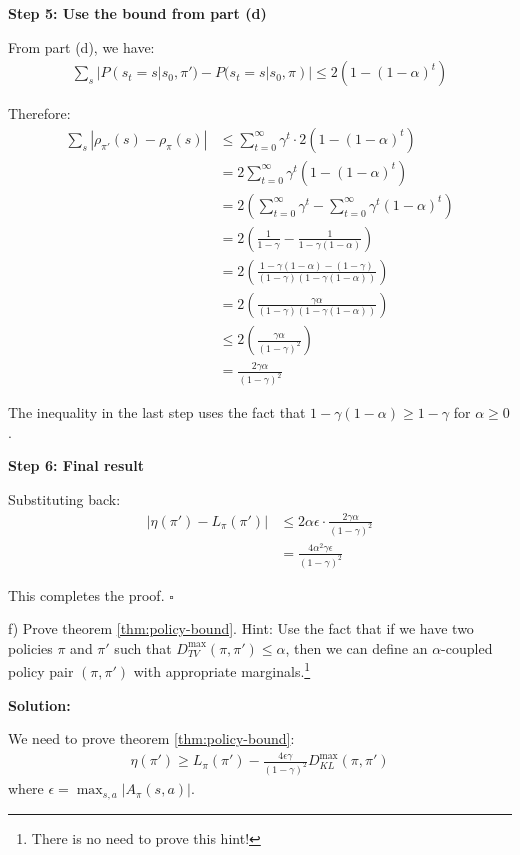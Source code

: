 \textbf{Step 5: Use the bound from part (d)}

From part (d), we have:
\begin{align}
\sum_{s} |P(s_t = s | s_0, \pi') - P(s_t = s | s_0, \pi)| \le 2(1-(1-\alpha)^t)
\end{align}

Therefore:
\begin{align}
\sum_{s} |\rho_{\pi'}(s) - \rho_{\pi}(s)| &\le \sum_{t=0}^{\infty} \gamma^t \cdot 2(1-(1-\alpha)^t) \\
&= 2 \sum_{t=0}^{\infty} \gamma^t (1-(1-\alpha)^t) \\
&= 2 \left( \sum_{t=0}^{\infty} \gamma^t - \sum_{t=0}^{\infty} \gamma^t (1-\alpha)^t \right) \\
&= 2 \left( \frac{1}{1-\gamma} - \frac{1}{1-\gamma(1-\alpha)} \right) \\
&= 2 \left( \frac{1-\gamma(1-\alpha) - (1-\gamma)}{(1-\gamma)(1-\gamma(1-\alpha))} \right) \\
&= 2 \left( \frac{\gamma\alpha}{(1-\gamma)(1-\gamma(1-\alpha))} \right) \\
&\le 2 \left( \frac{\gamma\alpha}{(1-\gamma)^2} \right) \\
&= \frac{2\gamma\alpha}{(1-\gamma)^2}
\end{align}

The inequality in the last step uses the fact that $1-\gamma(1-\alpha) \ge 1-\gamma$ for $\alpha \ge 0$.

\textbf{Step 6: Final result}

Substituting back:
\begin{align}
|\eta(\pi') - L_{\pi}(\pi')| &\le 2\alpha\epsilon \cdot \frac{2\gamma\alpha}{(1-\gamma)^2} \\
&= \frac{4\alpha^2\gamma\epsilon}{(1-\gamma)^2}
\end{align}

This completes the proof. $\square$

f) Prove theorem \ref{thm:policy-bound}. Hint: Use the fact that if we have two policies $\pi$ and $\pi'$ such that $D_{TV}^{\max} (\pi, \pi') \le \alpha$, then we can define an $\alpha$-coupled policy pair $(\pi, \pi')$ with appropriate marginals.\footnote{There is no need to prove this hint!}

\textbf{Solution:}

We need to prove theorem \ref{thm:policy-bound}:
\begin{align*}
\eta(\pi') \ge L_{\pi}(\pi') - \frac{4\epsilon\gamma}{(1-\gamma)^2}D_{KL}^{\max}(\pi, \pi')
\end{align*}
where $\epsilon = \max_{s, a} |A_{\pi}(s, a)|$.


